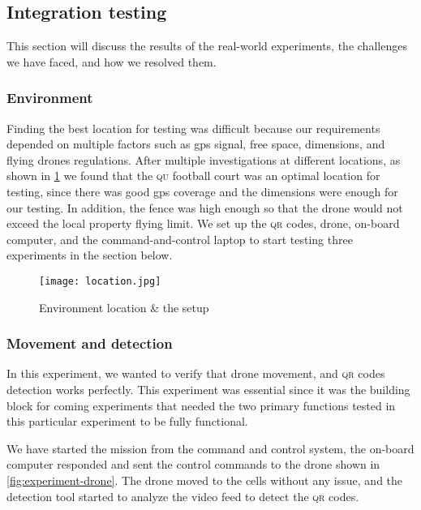 \documentclass[../main.tex]{subfiles}
\begin{document}
\subsection{Integration testing}

This section will discuss the results of the 
real-world experiments, the challenges we have faced,
and how we resolved them.

\subsubsection{Environment}

Finding the best location for testing was difficult
because our requirements depended on multiple factors 
such as \gls{gps} signal, free space, dimensions,
and flying drones regulations. After multiple investigations
at different locations, as shown in \cref{fig:testing-location}
we found that the \textsc{qu} football court was an optimal location
for testing, since there was good \gls{gps} coverage and the
dimensions were enough for our testing. 
In addition, the fence was high enough so that
the drone would not exceed the local property flying limit.
We set up the \textsc{qr} codes, drone, on-board computer, and the
command-and-control laptop to start testing three experiments in the
section below.

\begin{figure}[H]
	\centering
	\texttt{[image: location.jpg]}
	\caption{Environment location \& the setup}
	\label{fig:testing-location}
\end{figure} 

\subsubsection{Movement and detection}

In this experiment, we wanted to verify that drone movement, and
\textsc{qr} codes detection works perfectly. This experiment was 
essential since it was the building block for coming experiments
that needed the two primary functions tested in this particular
experiment to be fully functional.

We have started the mission from the command and control system, 
the on-board computer responded and sent the control commands 
to the drone shown in \cref{fig:experiment-drone}.
The drone moved to the cells without any issue,
and the detection tool started to analyze 
the video feed to detect the \textsc{qr} codes.
\end{document}
